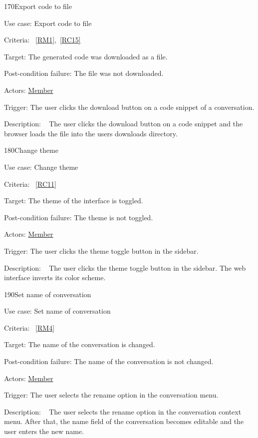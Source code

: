 \begin{function}{170}{Export code to file}
	\item[Use case:] Export code to file
	\item[Criteria:]~\ref{RM1},~\ref{RC15}
	\item[Target:] The generated code was downloaded as a file.
	\item[Post-condition failure:] The file was not downloaded.
	\item[Actors:] \hyperref[def:member]{Member}
	\item[Trigger:] The user clicks the download button on a code snippet of a conversation.
	\item[Description:] ~
	The user clicks the download button on a code snippet and the browser loads the file into the users downloads directory.
\end{function}

\vspace{2.0em}

\begin{function}{180}{Change theme}
	\item[Use case:] Change theme
	\item[Criteria:]~\ref{RC11}
	\item[Target:] The theme of the interface is toggled.
	\item[Post-condition failure:] The theme is not toggled.
	\item[Actors:] \hyperref[def:member]{Member}
	\item[Trigger:] The user clicks the theme toggle button in the sidebar.
	\item[Description:] ~
	The user clicks the theme toggle button in the sidebar.
	The web interface inverts its color scheme.
\end{function}

\vspace{2.0em}

\begin{function}{190}{Set name of conversation}
	\item[Use case:] Set name of conversation
	\item[Criteria:]~\ref{RM4}
	\item[Target:] The name of the conversation is changed.
	\item[Post-condition failure:] The name of the conversation is not changed.
	\item[Actors:] \hyperref[def:member]{Member}
	\item[Trigger:] The user selects the rename option in the conversation menu.
	\item[Description:] ~
	The user selects the rename option in the conversation context menu.
	After that, the name field of the conversation becomes editable and the user enters the new name.
\end{function}

